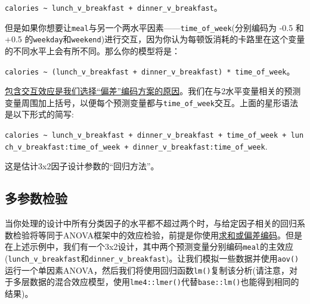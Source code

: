 \documentclass[
]{book}
\begin{document}
\texttt{calories\ \textasciitilde{}\ lunch\_v\_breakfast\ +\ dinner\_v\_breakfast}。

但是如果你想要让\texttt{meal}与另一个两水平因素------\texttt{time\_of\_week}(分别编码为 -0.5 和 +0.5 的\texttt{weekday}和\texttt{weekend})进行交互，因为你认为每顿饭消耗的卡路里在这个变量的不同水平上会有所不同。那么你的模型将是：

\texttt{calories\ \textasciitilde{}\ (lunch\_v\_breakfast\ +\ dinner\_v\_breakfast)\ *\ time\_of\_week}。

\href{交互效应.html\#分类变量的编码方案}{包含交互效应是我们选择``偏差''编码方案的原因}。我们在与2水平变量相关的预测变量周围加上括号，以便每个预测变量都与\texttt{time\_of\_week}交互。上面的星形语法是以下形式的简写:

\texttt{calories\ \textasciitilde{}\ lunch\_v\_breakfast\ +\ dinner\_v\_breakfast\ +\ time\_of\_week\ +\ lunch\_v\_breakfast:time\_of\_week\ +\ dinner\_v\_breakfast:time\_of\_week}.

这是估计3x2因子设计参数的``回归方法''。

\hypertarget{ux591aux53c2ux6570ux68c0ux9a8c}{%
\subsection{多参数检验}\label{ux591aux53c2ux6570ux68c0ux9a8c}}

当你处理的设计中所有分类因子的水平都不超过两个时，与给定因子相关的回归系数检验将等同于ANOVA框架中的效应检验，前提是你使用\href{多元回归.html\#处理分类预测变量}{求和或偏差编码}。但是在上述示例中，我们有一个3x2设计，其中两个预测变量分别编码\texttt{meal}的主效应(\texttt{lunch\_v\_breakfast}和\texttt{dinner\_v\_breakfast})。让我们模拟一些数据并使用\texttt{aov()}运行一个单因素ANOVA，然后我们将使用回归函数\texttt{lm()}复制该分析(请注意，对于多层数据的混合效应模型，使用\texttt{lme4::lmer()}代替\texttt{base::lm()}也能得到相同的结果)。
\end{document}
